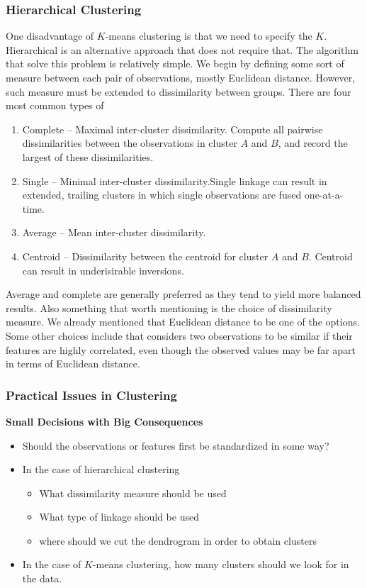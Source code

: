 \subsubsection{Hierarchical Clustering}
One disadvantage of $K$-means clustering is that we need to specify the $K$. Hierarchical is an alternative approach that does not require that. The algorithm that solve this problem is relatively simple. We begin by defining some sort of  measure between each pair of observations, mostly Euclidean distance. However, such measure must be extended to dissimilarity between groups. There are four most common types of 
\begin{enumerate}
	\setlength{\itemsep}{0pt}
	\item Complete -- Maximal inter-cluster dissimilarity. Compute all pairwise dissimilarities between the observations in cluster $A$ and $B$, and record the largest of these dissimilarities.
	\item Single -- Minimal inter-cluster dissimilarity.Single linkage can result in extended, trailing
	clusters in which single observations are fused one-at-a-time.
	\item Average -- Mean inter-cluster dissimilarity.
	\item Centroid -- Dissimilarity between the centroid for cluster $A$ and $B$. Centroid can result in underisirable inversions.
\end{enumerate}

Average and complete are generally preferred as they tend to yield more balanced results. Also something that worth mentioning is the choice of dissimilarity measure. We already mentioned that Euclidean distance to be one of the options. Some other choices include  that considers two observations to be similar if their features are highly correlated, even though the observed values may be far apart in terms of Euclidean distance.

\subsubsection{Practical Issues in Clustering}
\textbf{Small Decisions with Big Consequences}
\begin{itemize}
	\setlength{\itemsep}{0pt}
	\item Should the observations or features first be standardized in some way?
	\item In the case of hierarchical clustering \begin{itemize}
		\item What dissimilarity measure should be used
		\item What type of linkage should be used
		\item where should we cut the dendrogram in order to obtain clusters
	\end{itemize}
	\item In the case of $K$-means clustering, how many clusters should we look for in the data.
\end{itemize}